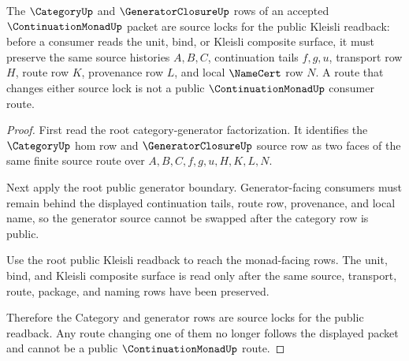 \begin{theorem}
\label{thm:continuation-monad-root-category-generator-namecert-source-lock}
The $\CategoryUp$ and $\GeneratorClosureUp$ rows of an accepted $\ContinuationMonadUp$ packet are source locks for the public Kleisli readback: before a consumer reads the unit, bind, or Kleisli composite surface, it must preserve the same source histories $A,B,C$, continuation tails $f,g,u$, transport row $H$, route row $K$, provenance row $L$, and local $\NameCert$ row $N$. A route that changes either source lock is not a public $\ContinuationMonadUp$ consumer route.
\end{theorem}
\begin{proof}
First read the root category-generator factorization. It identifies the $\CategoryUp$ hom row and $\GeneratorClosureUp$ source row as two faces of the same finite source route over $A,B,C,f,g,u,H,K,L,N$.

Next apply the root public generator boundary. Generator-facing consumers must remain behind the displayed continuation tails, route row, provenance, and local name, so the generator source cannot be swapped after the category row is public.

Use the root public Kleisli readback to reach the monad-facing rows. The unit, bind, and Kleisli composite surface is read only after the same source, transport, route, package, and naming rows have been preserved.

Therefore the Category and generator rows are source locks for the public readback. Any route changing one of them no longer follows the displayed packet and cannot be a public $\ContinuationMonadUp$ route.
\end{proof}

